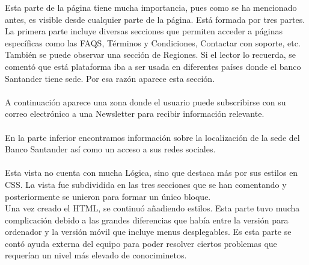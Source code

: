 \documentclass[a4paper,12pt]{article}
\begin{document}
\begin{itemize}
\begin{itemize}
        Esta parte de la página tiene mucha importancia, pues como se ha mencionado antes, es visible desde cualquier parte de la página. Está formada por tres partes. La primera parte incluye diversas secciones que permiten acceder a páginas específicas como las FAQS, Términos y Condiciones, Contactar con soporte, etc.\\
        También se puede observar una sección de Regiones. Si el lector lo recuerda, se comentó que está plataforma iba a ser usada en diferentes países donde el banco Santander tiene sede. Por esa razón aparece esta sección.\\
        \\
        A continuación aparece una zona donde el usuario puede subscribirse con su correo electrónico a una Newsletter para recibir información relevante.\\
        \\
        En la parte inferior encontramos información sobre la localización de la sede del Banco Santander así como un acceso a sus redes sociales.\\
        \\
        Esta vista no cuenta con mucha Lógica, sino que destaca más por sus estilos en CSS. La vista fue subdividida en las tres secciones que se han comentando y posteriormente se unieron para formar un único bloque.\\
        Una vez creado el HTML, se continuó añadiendo estilos. Esta parte tuvo mucha complicación debido a las grandes diferencias que había entre la versión para ordenador y la versión móvil que incluye menus desplegables. Es esta parte se contó ayuda externa del equipo para poder resolver ciertos problemas que requerían un nivel más elevado de conociminetos.\\
        

\end{itemize}
\end{itemize}
\end{document}
